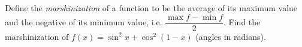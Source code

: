 Define the \emph{marshinization} of a function to be the average of its maximum value and the negative of its minimum value, i.e. $\dfrac{\max f-\min f}{2}$. Find the marshinization of $f(x)=\sin^2x+\cos^2(1-x)$ (angles in radians).
